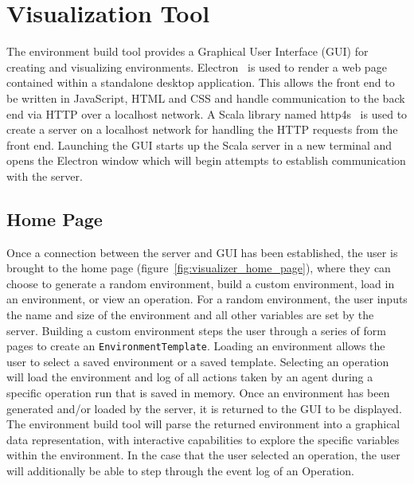 \section{Visualization Tool} \label{sec:visualization_tool}
The environment build tool provides a Graphical User Interface (GUI) for creating and visualizing environments.
Electron~\cite{electron} is used to render a web page contained within a standalone desktop application.
This allows the front end to be written in JavaScript, HTML and CSS and handle communication to the back end via HTTP over a localhost network.
A Scala library named http4s~\cite{http4s} is used to create a server on a localhost network for handling the HTTP requests from the front end.
Launching the GUI starts up the Scala server in a new terminal and opens the Electron window which will begin attempts to establish communication with the server.


\subsection{Home Page} \label{subsec:home_page}
Once a connection between the server and GUI has been established, the user is brought to the home page (figure~\ref{fig:visualizer_home_page}), where they can choose to generate a random environment, build a custom environment, load in an environment, or view an operation.
For a random environment, the user inputs the name and size of the environment and all other variables are set by the server.
Building a custom environment steps the user through a series of form pages to create an \texttt{EnvironmentTemplate}.
Loading an environment allows the user to select a saved environment or a saved template.
Selecting an operation will load the environment and log of all actions taken by an agent during a specific operation run that is saved in memory.
Once an environment has been generated and/or loaded by the server, it is returned to the GUI to be displayed.
The environment build tool will parse the returned environment into a graphical data representation, with interactive capabilities to explore the specific variables within the environment.
In the case that the user selected an operation, the user will additionally be able to step through the event log of an Operation.

